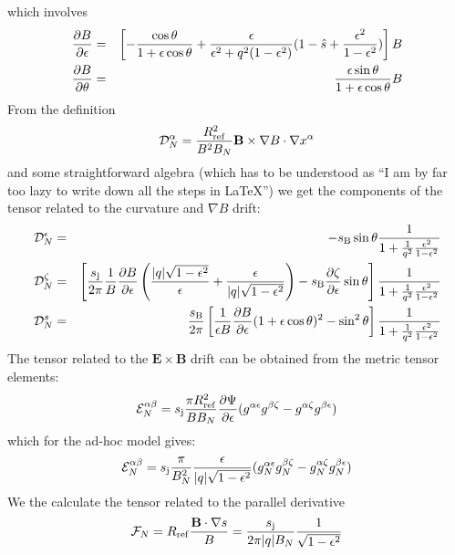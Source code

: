 which involves
\begin{eqnarray}
 \frac{\partial B}{\partial \epsilon} &=&  \left[ -\frac{\cos\theta}{1+\epsilon\cos\theta} + \frac{\epsilon}{\epsilon^2+q^2(1-\epsilon^2)}(1-\hat{s}+\frac{\epsilon^2}{1-\epsilon^2})\right]B\\
 \frac{\partial B}{\partial \theta} &=& \frac{\epsilon\sin\theta}{1+\epsilon\cos\theta}B
\end{eqnarray}
From the definition 
\begin{equation}
 \mathcal{D}^\alpha_N = \frac{R_{\mathrm{ref}}^2}{B^2B_N}\mathbf{B}\times\nabla B \cdot \nabla x^\alpha
\end{equation}
and some straightforward algebra (which has to be understood as ``I am by far too lazy to write down all the steps in \LaTeX'') we get the components of the tensor related to the curvature and
$\nabla B$ drift:
\begin{eqnarray}
 \mathcal{D}^{\epsilon}_N &=& -s_{\mathrm{B}} \sin\theta \frac{1}{1+\frac{1}{q^2}\frac{\epsilon^2}{1-\epsilon^2}} \\
 \mathcal{D}^{\zeta}_N &=& \left[\frac{s_{\mathrm{j}}}{2\pi} \frac{1}{B}\frac{\partial B}{\partial 
\epsilon}\left(\frac{|q|\sqrt{1-\epsilon^2}}{\epsilon}+\frac{\epsilon}{|q|\sqrt{1-\epsilon^2}}\right)-s_{\mathrm{B}}\frac{\partial \zeta}{\partial \epsilon}\sin\theta \right]
\frac{1}{1+\frac{1}{q^2}\frac{\epsilon^2}{1-\epsilon^2}}\\
 \mathcal{D}^{s}_N &=& \frac{s_{\mathrm{B}}}{2\pi}\left[\frac{1}{\epsilon B}\frac{\partial B}{\partial \epsilon}(1+\epsilon\cos\theta)^2 -\sin^2\theta\right]
\frac{1}{1+\frac{1}{q^2}\frac{\epsilon^2}{1-\epsilon^2}}\\
\end{eqnarray}
The tensor related to the $\mathbf{E}\times\mathbf{B}$ drift can be obtained from the metric tensor elements:
\begin{equation}
 \mathcal{E}^{\alpha\beta}_N = s_{\mathrm{j}}\frac{\pi R_{\mathrm{ref}}^2}{BB_N}\frac{\partial \Psi}{\partial \epsilon}(g^{\alpha\epsilon} g^{\beta\zeta} - g^{\alpha\zeta} g^{\beta\epsilon})
\end{equation}
which for the ad-hoc model gives:
\begin{equation}
 \mathcal{E}^{\alpha\beta}_N = s_{\mathrm{j}}\frac{\pi }{B_N^2}\frac{\epsilon}{|q|\sqrt{1-\epsilon^2}}(g^{\alpha\epsilon}_N g^{\beta\zeta}_N - g^{\alpha\zeta}_N g^{\beta\epsilon}_N)
\end{equation}
We the calculate the tensor related to the parallel derivative 
\begin{equation}
 \mathcal{F}_N = R_{\mathrm{ref}} \frac{\mathbf{B}\cdot\nabla s}{B} = \frac{s_{\mathrm{j}}}{2\pi |q| B_N}\frac{1}{\sqrt{1-\epsilon^2}}
\end{equation}
